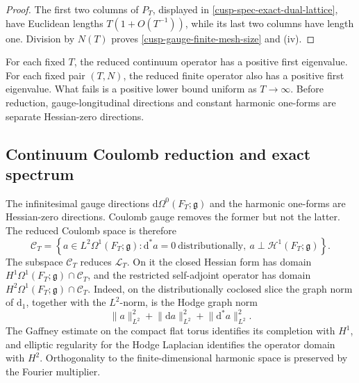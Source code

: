 \begin{proof}
The first two columns of \(P_T\), displayed in
\cref{cusp-spec-exact-dual-lattice}, have Euclidean lengths
\(T(1+O(T^{-1}))\), while its last two columns have length one.  Division
by \(N(T)\) proves \cref{cusp-gauge-finite-mesh-size} and (iv).
\end{proof}

\begin{remark}
\label{cusp-gauge-pointwise-versus-uniform}
For each fixed \(T\), the reduced continuum operator has a positive first
eigenvalue.  For each fixed pair \((T,N)\), the reduced finite operator
also has a positive first eigenvalue.  What fails is a positive lower
bound uniform as \(T\to\infty\).  Before reduction, gauge-longitudinal
directions and constant harmonic one-forms are separate Hessian-zero
directions.
\end{remark}

\subsection{Continuum Coulomb reduction and exact spectrum}
\label{cusp-gauge-continuum-spectrum-subsection}

The infinitesimal gauge directions
\(\mathrm d\Omega^0(F_T;\mathfrak g)\) and the harmonic one-forms are
Hessian-zero directions.  Coulomb gauge removes the former but not the
latter.  The reduced Coulomb space is therefore
\begin{equation}
 \mathscr C_T=
 \left\{
 a\in L^2\Omega^1(F_T;\mathfrak g):
 \mathrm d^*a=0\ \text{distributionally},\
 a\perp\mathcal H^1(F_T;\mathfrak g)
 \right\}.
 \label{cusp-gauge-continuum-reduced-coulomb}
\end{equation}
The subspace \(\mathscr C_T\) reduces \(\mathcal L_T\).  On it the closed
Hessian form has domain
\(H^1\Omega^1(F_T;\mathfrak g)\cap\mathscr C_T\), and the restricted
self-adjoint operator has domain
\(H^2\Omega^1(F_T;\mathfrak g)\cap\mathscr C_T\).  Indeed, on the
distributionally coclosed slice the graph norm of \(\mathrm d_1\), together
with the \(L^2\)-norm, is the Hodge graph norm
\[
 \lVert a\rVert_{L^2}^2+
 \lVert\mathrm da\rVert_{L^2}^2+
 \lVert\mathrm d^*a\rVert_{L^2}^2.
\]
The Gaffney estimate on the compact flat torus identifies its completion
with \(H^1\), and elliptic regularity for the Hodge Laplacian identifies the
operator domain with \(H^2\).  Orthogonality to the finite-dimensional
harmonic space is preserved by the Fourier multiplier.

